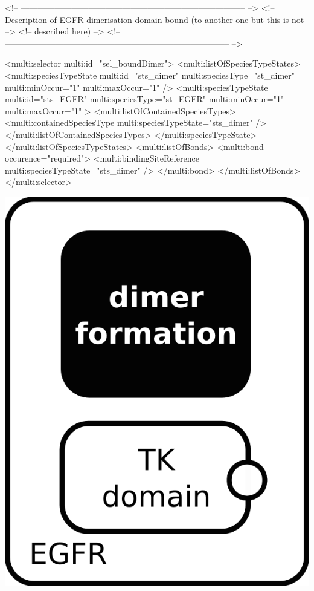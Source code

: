 \begin{example}
<!-- -------------------------------------------------------------------------------- -->
<!-- Description of EGFR dimerisation domain bound (to another one but this is not    -->
<!-- described here)                                                                  -->
<!-- -------------------------------------------------------------------------------- -->

      <multi:selector multi:id="sel_boundDimer">
        <multi:listOfSpeciesTypeStates>
          <multi:speciesTypeState multi:id="sts_dimer" multi:speciesType="st_dimer" 
                                   multi:minOccur="1" multi:maxOccur="1" />
          <multi:speciesTypeState multi:id="sts_EGFR" multi:speciesType="st_EGFR" 
                                   multi:minOccur="1" multi:maxOccur="1" >
            <multi:listOfContainedSpeciesTypes>
              <multi:containedSpeciesType multi:speciesTypeState="sts_dimer" /> 
            </multi:listOfContainedSpeciesTypes>            
          </multi:speciesTypeState>
        </multi:listOfSpeciesTypeStates>
        <multi:listOfBonds>
          <multi:bond occurence="required">
            <multi:bindingSiteReference multi:speciesTypeState="sts_dimer" />
          </multi:bond>
        </multi:listOfBonds>
      </multi:selector>
\end{example}

\includegraphics{figs/pngs/sel_EGFRDimerNonPhos.png}


